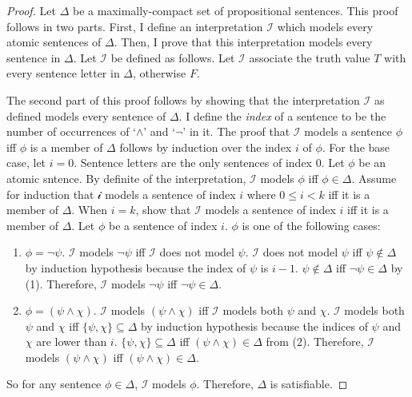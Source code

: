 \documentclass[12pt]{article}
\theoremstyle{definition}
\theoremstyle{remark}
\begin{document}
\begin{proof}
	Let $\Delta$ be a maximally-compact set of propositional sentences. This proof follows in two parts. First, I define an interpretation $\mathscr{I}$ which models every atomic sentences of $\Delta$. Then, I prove that this interpretation models every sentence in $\Delta$. Let $\mathscr{I}$ be defined as follows. Let $\mathscr{I}$ associate the truth value $T$ with every sentence letter in $\Delta$, otherwise $F$.
	
	The second part of this proof follows by showing that the interpretation $\mathscr{I}$ as defined models every sentence of $\Delta$. I define the \textit{index} of a sentence to be the number of occurrences of `$\land$' and `$\neg$' in it.  The proof that $\mathscr{I}$ models a sentence $\phi$ iff $\phi$ is a member of $\Delta$ follows by induction over the index $i$ of $\phi$. For the base case, let $i=0$. Sentence letters are the only sentences of index 0. Let $\phi$ be an atomic sntence. By definite of the interpretation, $\mathscr{I}$ models $\phi$ iff $\phi \in \Delta$. Assume for induction that $\mathscr{i}$ models a sentence of index $i$ where $0 \leq i < k$ iff it is a member of $\Delta$. When $i=k$, show that $\mathscr{I}$ models a sentence of index $i$ iff it is a member of $\Delta$. Let $\phi$ be a sentence of index $i$. $\phi$ is one of the following cases: 
	
	\begin{enumerate}
		\item $\phi = \neg\psi$. $\mathscr{I}$ models $\neg\psi$ iff $\mathscr{I}$ does not model $\psi$. $\mathscr{I}$ does not model $\psi$ iff $\psi \not\in \Delta$ by induction hypothesis because the index of $\psi$ is $i-1$. $\psi \not\in \Delta$ iff $\neg\psi \in \Delta$ by (1). Therefore, $\mathscr{I}$ models $\neg\psi$ iff $\neg\psi \in \Delta$.
		\item $\phi = (\psi \land \chi)$. $\mathscr{I}$ models $(\psi \land \chi)$ iff $\mathscr{I}$ models both $\psi$ and $\chi$. $\mathscr{I}$ models both $\psi$ and $\chi$ iff $\{ \psi, \chi \} \subseteq \Delta$ by induction hypothesis because the indices of $\psi$ and $\chi$ are lower than $i$. $\{ \psi, \chi \} \subseteq \Delta$ iff $(\psi \land \chi) \in \Delta$ from (2). Therefore, $\mathscr{I}$ models $(\psi \land \chi)$ iff $(\psi \land \chi) \in \Delta$.
	\end{enumerate}
	
	So for any sentence $\phi \in \Delta$, $\mathscr{I}$ models $\phi$. Therefore, $\Delta$ is satisfiable.
\end{proof}
\end{document}

